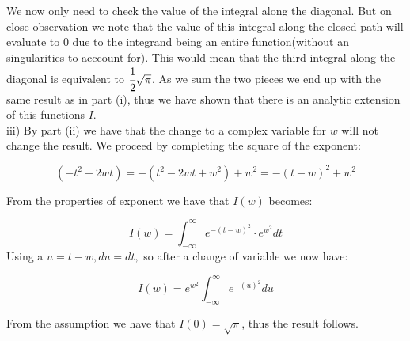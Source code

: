 \documentclass[addpoints,12pt]{exam}
\begin{document}
\begin{questions}
We now only need to check the value of the integral along the diagonal.  But on close observation we note that the value of this integral along the closed path will evaluate to $0$ due to the integrand being an entire function(without an singularities to acccount for).  This would mean that the third integral along the diagonal is equivalent to $\cfrac{1}{2}\sqrt{\pi}$. As we sum the two pieces we end up with the same result as in part (i), thus we have shown that there is an analytic extension of this functions $I$. \\

iii) By part (ii) we have that the change to a complex variable for $w$ will not change the result.  We proceed by completing the square of the exponent:

$$(-t^2+2wt)=-(t^2-2wt+ w^2)+w^2=-(t-w)^2+w^2$$

From the properties of exponent we have that $I(w)$ becomes:

$$I(w) = \int_{-\infty}^{\infty} e^{-(t-w)^2} \cdot e^{w^2} dt$$
Using a $u=t-w, du=dt,$ so after a change of variable we now have:

$$I(w) = e^{w^2}\int_{-\infty}^{\infty} e^{-(u)^2} du$$

From the assumption we have that $I(0)=\sqrt{\pi}$, thus the result follows. \\

\end{questions}
\end{document}

